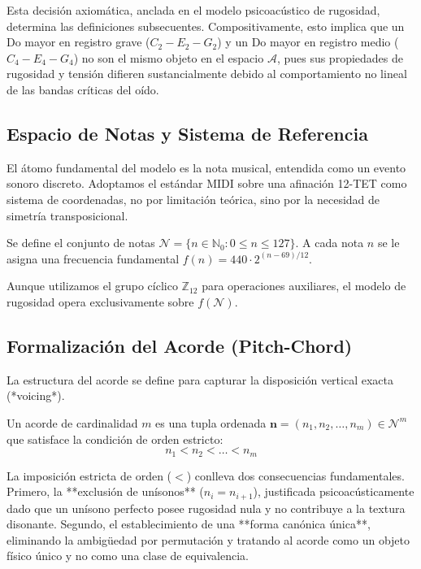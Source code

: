 Esta decisión axiomática, anclada en el modelo psicoacústico de rugosidad, determina las definiciones subsecuentes. Compositivamente, esto implica que un Do mayor en registro grave ($C_2-E_2-G_2$) y un Do mayor en registro medio ($C_4-E_4-G_4$) no son el mismo objeto en el espacio $\mathcal{A}$, pues sus propiedades de rugosidad y tensión difieren sustancialmente debido al comportamiento no lineal de las bandas críticas del oído.

\subsection{Espacio de Notas y Sistema de Referencia}

El átomo fundamental del modelo es la nota musical, entendida como un evento sonoro discreto. Adoptamos el estándar MIDI sobre una afinación 12-TET como sistema de coordenadas, no por limitación teórica, sino por la necesidad de simetría transposicional.

\begin{definition}
Se define el conjunto de notas $\mathcal{N} = \{n \in \mathbb{N}_0 : 0 \leq n \leq 127\}$. A cada nota $n$ se le asigna una frecuencia fundamental $f(n) = 440 \cdot 2^{(n-69)/12}$.
\end{definition}

Aunque utilizamos el grupo cíclico $\mathbb{Z}_{12}$ para operaciones auxiliares, el modelo de rugosidad opera exclusivamente sobre $f(\mathcal{N})$.

\subsection{Formalización del Acorde (Pitch-Chord)}

La estructura del acorde se define para capturar la disposición vertical exacta (*voicing*).

\begin{definition}[Acorde]
Un acorde de cardinalidad $m$ es una tupla ordenada $\mathbf{n} = (n_1, n_2, \dots, n_m) \in \mathcal{N}^m$ que satisface la condición de orden estricto:
\begin{equation}
n_1 < n_2 < \dots < n_m
\end{equation}
\end{definition}

La imposición estricta de orden ($<$) conlleva dos consecuencias fundamentales. Primero, la **exclusión de unísonos** ($n_i = n_{i+1}$), justificada psicoacústicamente dado que un unísono perfecto posee rugosidad nula y no contribuye a la textura disonante. Segundo, el establecimiento de una **forma canónica única**, eliminando la ambigüedad por permutación y tratando al acorde como un objeto físico único y no como una clase de equivalencia.

